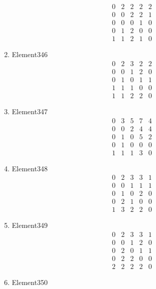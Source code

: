 \documentclass[12pt]{article}
\begin{document}
\begin{multicols}{3}
\begin{enumerate}
\begin{equation*}
\begin{array}{ccccc}
0&2&2&2&2\\
0&0&2&2&1\\
0&0&0&1&0\\
0&1&2&0&0\\
1&1&2&1&0
\end{array}
\end{equation*}
\item Element346
\begin{equation*}
\begin{array}{ccccc}
0&2&3&2&2\\
0&0&1&2&0\\
0&1&0&1&1\\
1&1&1&0&0\\
1&1&2&2&0
\end{array}
\end{equation*}
\item Element347
\begin{equation*}
\begin{array}{ccccc}
0&3&5&7&4\\
0&0&2&4&4\\
0&1&0&5&2\\
0&1&0&0&0\\
1&1&1&3&0
\end{array}
\end{equation*}
\item Element348
\begin{equation*}
\begin{array}{ccccc}
0&2&3&3&1\\
0&0&1&1&1\\
0&1&0&2&0\\
0&2&1&0&0\\
1&3&2&2&0
\end{array}
\end{equation*}
\item Element349
\begin{equation*}
\begin{array}{ccccc}
0&2&3&3&1\\
0&0&1&2&0\\
0&2&0&1&1\\
0&2&2&0&0\\
2&2&2&2&0
\end{array}
\end{equation*}
\item Element350
\begin{equation*}
\begin{array}{ccccc}

\end{array}
\end{equation*}
\end{enumerate}
\end{multicols}
\end{document}

